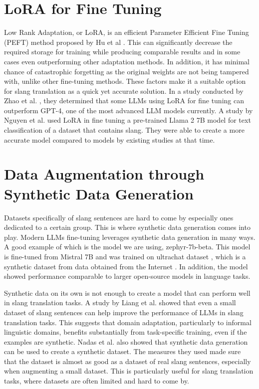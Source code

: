\section{LoRA for Fine Tuning}
Low Rank Adaptation, or LoRA, is an efficient Parameter Efficient Fine Tuning (PEFT) method proposed by Hu et al \cite{hu2021loralowrankadaptationlarge}.
This can significantly decrease the required storage for training while producing comparable results and in some cases even outperforming other adaptation methods.
In addition, it has minimal chance of catastrophic forgetting as the original weights are not being tampered with, unlike other fine-tuning methods.
These factors make it a suitable option for slang translation as a quick yet accurate solution.
In a study conducted by Zhao et al. \cite{zhao2024loraland310finetuned}, they determined that some LLMs using LoRA for fine tuning can outperform GPT-4, one of the most advanced LLM models currently.
A study by Nguyen et al. \cite{nguyen2023finetuningllama2large} used LoRA in fine tuning a pre-trained Llama 2 7B model for text classification of a dataset that contains slang.
They were able to create a more accurate model compared to models by existing studies at that time. 

\section{Data Augmentation through Synthetic Data Generation}
Datasets specifically of slang sentences are hard to come by especially ones dedicated to a certain group. This is where synthetic data generation comes into play. Modern LLMs fine-tuning leverages synthetic data generation in many ways. A good example of which is the model we are using, zephyr-7b-beta. This model is fine-tuned from Mistral 7B and was trained on ultrachat dataset \cite{tunstall2023zephyr}, which is a synthetic dataset from data obtained from the Internet \cite{ding2023enhancing}. In addition, the model showed performance comparable to larger open-source models in language tasks.

Synthetic data on its own is not enough to create a model that can perform well in slang translation tasks. A study by Liang et al. \cite{liang2025slangditbenchmarkingllmsinterpretative} showed that even a small dataset of slang sentences can help improve the performance of LLMs in slang translation tasks. This suggests that domain adaptation, particularly to informal linguistic domains, benefits substantially from task-specific training, even if the examples are synthetic. Nadas et al. \cite{nadas2025syntheticdatagenerationusing} also showed that synthetic data generation can be used to create a synthetic dataset. The measures they used made sure that the dataset is almost as good as a dataset of real slang sentences, especially when augmenting a small dataset. This is particularly useful for slang translation tasks, where datasets are often limited and hard to come by.

